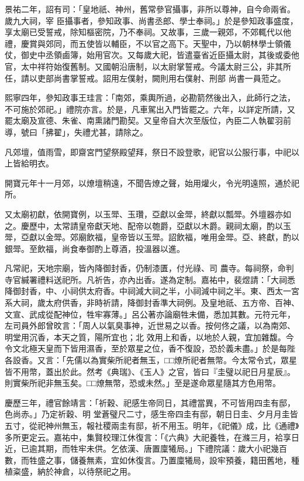 \begin{pinyinscope}
 景祐二年，詔有司：「皇地祇、神州，舊常參官攝事，非所以尊神，自今命兩省。歲九大祠，宰
 臣攝事者，參知政事、尚書丞郎、學士奉祠。」於是參知政事盛度，享太廟已受誓戒，除知樞密院，乃不奉祠。又故事，三歲一親郊，不郊輒代以他禮，慶賞與郊同，而五使皆以輔臣，不以官之高下。天聖中，乃以朝林學士領儀仗，御史中丞領鹵簿，始用官次。又每歲大祀，皆遣臺省近臣攝太尉，其後或委他官，太中祥符始復舊制。又國朝沿唐制，以太尉掌誓戒。今議太尉三公，非其所任，請以吏部尚書掌誓戒。詔用左僕射，闕則用右僕射、刑部
 尚書一員蒞之。



 熙寧四年，參知政事王珪言：「南郊，乘輿所過，必勘箭然後出入，此師行之法，不可施於郊祀。」禮院亦言。於是，凡車駕出入門皆罷之。六年，以詳定所請，又罷太廟及宣德、朱雀、南熏諸門勘契。又皇帝自大次至版位，內臣二人執翟羽前導，號曰「拂翟」，失禮尤甚，請除之。



 凡郊壇，值雨雪，即齋宮門望祭殿望拜，祭日不設登歌，祀官以公服行事，中祀以上皆給明衣。



 開寶元年十一月郊，以燎壇稍遠，不聞告燎之聲，始用爟火，令光明遠照，通於祀所。



 又太廟初獻，依開寶例，以玉斝、玉瓚，亞獻以金斝，終獻以瓢斝。外壇器亦如之。慶歷中，太常請皇帝獻天地、配帝以匏爵，亞獻以木爵。親祠太廟，酌以玉斝，亞獻以金斝。郊廟飲福，皇帝皆以玉斝。詔飲福，唯用金斝。亞、終獻，酌以銀斝。至飲福，尚食奉御酌上尊酒，投溫器以進。



 凡常祀，天地宗廟，皆內降御封香，仍制漆匱，付光祿、司
 農寺。每祠祭，命判寺官緘署禮料送祀所。凡祈告，亦內出香。遂為定制。嘉祐中，裴煜請：「大祠悉降御封香，中、小祠供太府香。中祠減大祠之半，小祠減中祠之半。東、西太一宮系大祠，歲太府供香，非時祈請，降御封香準大祠例。及皇地祇、五方帝、百神、文宣、武成從配神位，牲牢寡薄。」呂公著亦論廟牲未備，悉加其數。元符元年，左司員外郎曾旼言：「周人以氣臭事神，近世易之以香。按何佟之議，以為南郊、明堂用沉香，本天之質，陽所宜也；北
 效用上和香，以地於人親，宜加雜馥。今令文北極天皇而下皆用濕香，至於眾星之位，香不復設，恐於義未盡。」於是每陛各設香。又言：「先儒以為實柴所祀者無玉，□□燎所祀者無幣。今太常令式，眾星皆不用幣，蓋出於此。然考《典瑞》、《玉人》之官，皆曰『圭璧以祀日月星辰』。則實柴所祀非無玉矣。□□燎無幣，恐或未然。」至是遂命眾星隨其方色用幣。



 慶歷三年，禮官餘靖言：「祈穀、祀感生帝同日，其禮當異，不可皆用四圭有邸，色尚赤。」乃定祈穀、明
 堂蒼璧尺二寸，感生帝四圭有邸，朝日日圭、夕月月圭皆五寸，從祀神州無玉，報社稷兩圭有邸，祈不用玉。明年，《祀儀》成，比《通禮》多所更定云。嘉祐中，集賢校理江休復言：「《六典》大祀養牲，在滌三月，袷享日近，已逾其期，而牲牢未供。乞依漢、唐置廩犧局。」下禮院議：歲大小祀幾百數，而牲盛之事，儲養無素，宜如休復言。乃置廩犧局，設牢預養，籍田舊地，種植粢盛，納於神倉，以待祭祀之用。




\end{pinyinscope}
